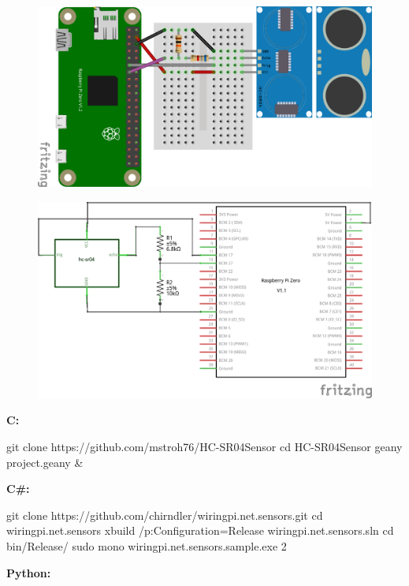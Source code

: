 

\begin{figure}[ht]
  \centering
  \includegraphics[scale=0.25]{images/HC-SR04_Steckplatine.png}	
  \label{DHT22_Steckplatine}
\end{figure}


\begin{figure}[ht]
	\centering
	\includegraphics[scale=0.25]{images/HC-SR04_Schaltplan.png}	
	\label{DHT22_Steckplatine}
\end{figure}

\textbf{C:} 

\begin{console}
	git clone https://github.com/mstroh76/HC-SR04Sensor
	cd HC-SR04Sensor
	geany project.geany & 
\end{console}

\textbf{C\#:}

\begin{console}
git clone https://github.com/chirndler/wiringpi.net.sensors.git
cd wiringpi.net.sensors
xbuild /p:Configuration=Release wiringpi.net.sensors.sln
cd bin/Release/
sudo mono wiringpi.net.sensors.sample.exe 2
\end{console}

\textbf{Python:}

\lstset{language=Python, caption=, 
        label=HCSR04Program, frame=single, basicstyle=\ttfamily
	      \footnotesize, breakatwhitespace=false, showstringspaces=false, 
        showtabs=false, tabsize=2 }


